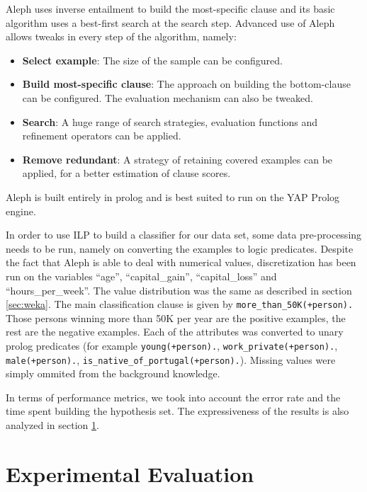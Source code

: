 \documentclass[a4paper]{llncs}
\begin{document}
Aleph uses inverse entailment to build the most-specific clause and its basic
algorithm uses a best-first search at the search step. Advanced use of Aleph 
allows tweaks in every step of the algorithm, namely:

\begin{itemize}
    \item{\textbf{Select example}: The size of the sample can be configured.}
    \item{\textbf{Build most-specific clause}: The approach on building the 
    bottom-clause can be configured. The evaluation mechanism can also be 
    tweaked.}
    \item{\textbf{Search}: A huge range of search strategies, evaluation 
    functions and refinement operators can be applied.}
    \item{\textbf{Remove redundant}: A strategy of retaining covered examples
    can be applied, for a better estimation of clause scores.}
\end{itemize}

Aleph is built entirely in prolog and is best suited to run on the YAP Prolog 
engine. 

In order to use ILP to build a classifier for our data set, some data
pre-processing needs to be run, namely on converting the examples to logic 
predicates. Despite the fact that Aleph is able to deal with numerical values,
discretization has been run on the variables ``age'', ``capital\_gain'', 
``capital\_loss'' and ``hours\_per\_week''. The value distribution was the same
as described in section \ref{sec:weka}. The main classification clause is given
by \verb$more_than_50K(+person).$ Those persons winning more than 50K per year
are the positive examples, the rest are the negative examples. Each of the
attributes was converted to unary prolog predicates (for example 
\verb$young(+person).$, \verb$work_private(+person).$, \verb$male(+person).$,
\verb$is_native_of_portugal(+person).$). Missing values were simply ommited from
the background knowledge.

In terms of performance metrics, we took into account the error rate and the 
time spent building the hypothesis set. The expressiveness of the results is
also analyzed in section \ref{sec:experimental_eval}.

\section{Experimental Evaluation} \label{sec:experimental_eval}
\end{document}
